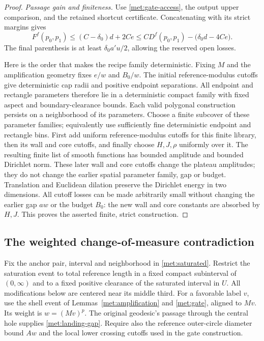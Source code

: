 \begin{proof}
\emph{Passage gain and finiteness.}
Use \eqref{met:gate-access}, the output upper comparison, and the
retained shortcut certificate.  Concatenating with its strict
margins gives
\[
 F^f(p_0,p_1)
 \leq (C-\delta_0)d+2Ce
 \leq C D^f(p_0,p_1)-\bigl(\delta_0d-4Ce\bigr).
\]
The final parenthesis is at least $\delta_0a'u/2$, allowing the
reserved open losses.

Here is the order that makes the recipe family deterministic.  Fixing
$M$ and the amplification geometry fixes $e/w$ and $B_0/w$.  The
initial reference-modulus cutoffs give deterministic cap radii and
positive endpoint separations.  All endpoint and rectangle parameters
therefore lie in a deterministic compact family with fixed aspect and
boundary-clearance bounds.  Each valid polygonal construction persists
on a neighborhood of its parameters.  Choose a finite subcover of these parameter families;
equivalently use sufficiently fine deterministic endpoint and
rectangle bins.  First add uniform reference-modulus cutoffs for this
finite library, then its wall and core cutoffs, and finally choose
$H,J,\rho$ uniformly over it.  The resulting finite list of smooth
functions has bounded amplitude and bounded Dirichlet norm.
These later wall and core cutoffs change the plateau amplitudes; they
do not change the earlier spatial parameter family, gap or budget.
Translation and Euclidean dilation preserve the Dirichlet energy in
two dimensions.  All cutoff losses can be made arbitrarily small
without changing the earlier gap $aw$ or the budget $B_0$: the new
wall and core constants are absorbed by $H,J$.  This proves the
asserted finite, strict construction.
\end{proof}

\subsection{The weighted change-of-measure contradiction}

Fix the anchor pair, interval and neighborhood in
\eqref{met:saturated}.  Restrict the saturation event to total
reference length in a fixed compact subinterval of $(0,\infty)$ and
to a fixed positive clearance of the saturated interval in $U$.
All modifications below are centered near its middle third.  For a
favorable label $v$, use the shell event of
Lemmas~\ref{met:amplification} and \ref{met:gate}, aligned to $Mv$.
Its weight is $w=(Mv)^p$.  The original geodesic's passage through the
central hole supplies \eqref{met:landing-gap}.  Require also the
reference outer-circle diameter bound $Aw$ and the local lower
crossing cutoffs used in the gate construction.

